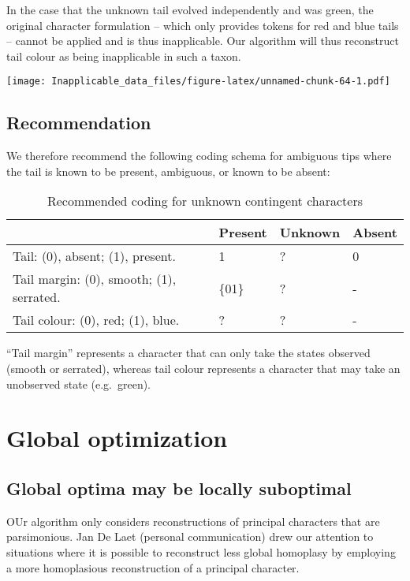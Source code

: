 \documentclass[]{book}
\theoremstyle{definition}
\theoremstyle{definition}
\theoremstyle{definition}
\theoremstyle{remark}
\begin{document}
In the case that the unknown tail evolved independently and was green,
the original character formulation -- which only provides tokens for red
and blue tails -- cannot be applied and is thus inapplicable. Our
algorithm will thus reconstruct tail colour as being inapplicable in
such a taxon.

\texttt{[image: Inapplicable\_data\_files/figure-latex/unnamed-chunk-64-1.pdf]}

\hypertarget{recommendation}{%
\section{Recommendation}\label{recommendation}}

We therefore recommend the following coding schema for ambiguous tips
where the tail is known to be present, ambiguous, or known to be absent:

\begin{table}

\caption{\label{tab:unnamed-chunk-65}Recommended coding for unknown contingent characters}
\centering
\begin{tabular}[t]{l|l|l|l}
\hline
  & Present & Unknown & Absent\\
\hline
Tail: (0), absent; (1), present. & 1 & ? & 0\\
\hline
Tail margin: (0), smooth; (1), serrated. & \{01\} & ? & -\\
\hline
Tail colour: (0), red; (1), blue. & ? & ? & -\\
\hline
\end{tabular}
\end{table}

``Tail margin'' represents a character that can only take the states
observed (smooth or serrated), whereas tail colour represents a
character that may take an unobserved state (e.g.~green).

\hypertarget{global}{%
\chapter{Global optimization}\label{global}}

\hypertarget{global-optima-may-be-locally-suboptimal}{%
\section{Global optima may be locally
suboptimal}\label{global-optima-may-be-locally-suboptimal}}

OUr algorithm only considers reconstructions of principal characters
that are parsimonious. Jan De Laet (personal communication) drew our
attention to situations where it is possible to reconstruct less global
homoplasy by employing a more homoplasious reconstruction of a principal
character.
\end{document}
